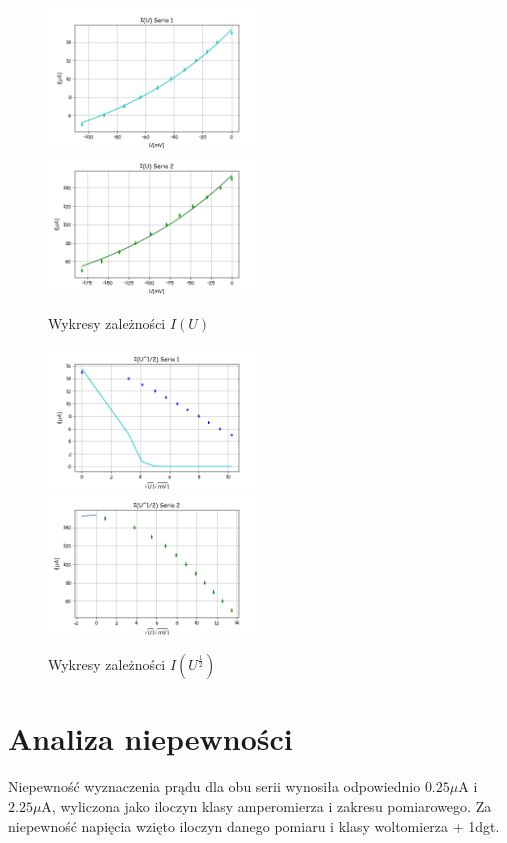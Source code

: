 \documentclass[a4paper,10pt]{article}
\begin{document}
\begin{figure}[H]
\includegraphics[width=0.5\textwidth]{zarzenieU1.png}
\includegraphics[width=0.5\textwidth]{zarzenieU2.png}
\caption{Wykresy zależności $I(U)$}
\end{figure}

\begin{figure}[H]
 \includegraphics[width=0.5\textwidth]{zarzenieU12.png}
 \includegraphics[width=0.5\textwidth]{zarzenieU22.png}
 \caption{Wykresy zależności $I(U^{\frac{1}{2}})$}
 \end{figure}
\section{Analiza niepewności}
Niepewność wyznaczenia prądu dla obu serii wynosiła odpowiednio $0.25\mu$A i $2.25\mu$A, wyliczona jako iloczyn klasy amperomierza i zakresu pomiarowego.
Za niepewność napięcia wzięto iloczyn danego pomiaru i klasy woltomierza + 1dgt.
\end{document}
